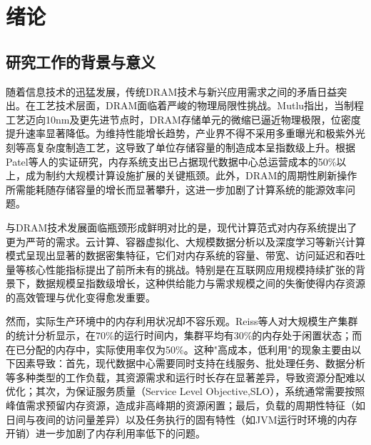 \chapter{绪\hspace{6pt}论}


\section{研究工作的背景与意义}

随着信息技术的迅猛发展，传统DRAM技术与新兴应用需求之间的矛盾日益突出。在工艺技术层面，DRAM面临着严峻的物理局限性挑战。Mutlu指出，当制程工艺迈向10nm及更先进节点时，DRAM存储单元的微缩已逼近物理极限，位密度提升速率显著降低。为维持性能增长趋势，产业界不得不采用多重曝光和极紫外光刻等高复杂度制造工艺，这导致了单位存储容量的制造成本呈指数级上升。根据Patel等人的实证研究，内存系统支出已占据现代数据中心总运营成本的50\%以上，成为制约大规模计算设施扩展的关键瓶颈。此外，DRAM的周期性刷新操作所需能耗随存储容量的增长而显著攀升，这进一步加剧了计算系统的能源效率问题。

与DRAM技术发展面临瓶颈形成鲜明对比的是，现代计算范式对内存系统提出了更为严苛的需求。云计算、容器虚拟化、大规模数据分析以及深度学习等新兴计算模式呈现出显著的数据密集特征，它们对内存系统的容量、带宽、访问延迟和吞吐量等核心性能指标提出了前所未有的挑战。特别是在互联网应用规模持续扩张的背景下，数据规模呈指数级增长，这种供给能力与需求规模之间的失衡使得内存资源的高效管理与优化变得愈发重要。

然而，实际生产环境中的内存利用状况却不容乐观。Reiss等人对大规模生产集群的统计分析显示，在70\%的运行时间内，集群平均有30\%的内存处于闲置状态；而在已分配的内存中，实际使用率仅为50\%。这种"高成本，低利用"的现象主要由以下因素导致：首先，现代数据中心需要同时支持在线服务、批处理任务、数据分析等多种类型的工作负载，其资源需求和运行时长存在显著差异，导致资源分配难以优化；其次，为保证服务质量（Service Level Objective,SLO），系统通常需要按照峰值需求预留内存资源，造成非高峰期的资源闲置；最后，负载的周期性特征（如日间与夜间的访问量差异）以及任务执行的固有特性（如JVM运行时环境的内存开销）进一步加剧了内存利用率低下的问题。

